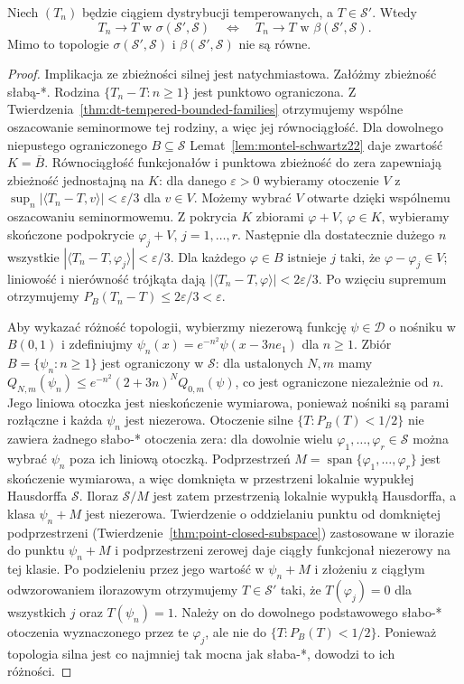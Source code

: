 \begin{twierdzenie}
\label{thm:seq-topologies-schwartz22}
Niech $(T_n)$ będzie ciągiem dystrybucji temperowanych,
a $T\in\mathcal S'$. Wtedy
\[
T_n\longrightarrow T\text{ w }\sigma(\mathcal S',\mathcal S)
\quad\Longleftrightarrow\quad
T_n\longrightarrow T\text{ w }\beta(\mathcal S',\mathcal S).
\]
Mimo to topologie $\sigma(\mathcal S',\mathcal S)$ i
$\beta(\mathcal S',\mathcal S)$ nie są równe.
\end{twierdzenie}
\begin{proof}
Implikacja ze zbieżności silnej jest natychmiastowa.
Załóżmy zbieżność słabą-*. Rodzina
$\{T_n-T:n\ge1\}$ jest punktowo ograniczona.
Z Twierdzenia~\ref{thm:dt-tempered-bounded-families}
otrzymujemy wspólne oszacowanie seminormowe tej rodziny,
a więc jej równociągłość.
Dla dowolnego niepustego ograniczonego $B\subseteq\mathcal S$
Lemat~\ref{lem:montel-schwartz22} daje zwartość
$K=\overline B$. Równociągłość funkcjonałów i
punktowa zbieżność do zera zapewniają zbieżność
jednostajną na $K$: dla danego $\varepsilon>0$
wybieramy otoczenie $V$ z
$\sup_n|\langle T_n-T,v\rangle|<\varepsilon/3$
dla $v\in V$. Możemy wybrać $V$ otwarte dzięki
wspólnemu oszacowaniu seminormowemu. Z pokrycia
$K$ zbiorami $\varphi+V$, $\varphi\in K$, wybieramy
skończone podpokrycie $\varphi_j+V$, $j=1,\ldots,r$.
Następnie dla dostatecznie dużego $n$ wszystkie
$|\langle T_n-T,\varphi_j\rangle|<\varepsilon/3$.
Dla każdego $\varphi\in B$ istnieje $j$ taki, że
$\varphi-\varphi_j\in V$; liniowość i nierówność
trójkąta dają
$|\langle T_n-T,\varphi\rangle|<2\varepsilon/3$.
Po wzięciu supremum otrzymujemy
$P_B(T_n-T)\le2\varepsilon/3<\varepsilon$.

Aby wykazać różność topologii, wybierzmy niezerową funkcję
$\psi\in\mathcal D$ o nośniku w $B(0,1)$ i zdefiniujmy
$\psi_n(x)=e^{-n^2}\psi(x-3ne_1)$ dla $n\ge1$.
Zbiór $B=\{\psi_n:n\ge1\}$ jest ograniczony w
$\mathcal S$: dla ustalonych $N,m$ mamy
$Q_{N,m}(\psi_n)\le e^{-n^2}(2+3n)^N Q_{0,m}(\psi)$,
co jest ograniczone niezależnie od $n$.
Jego liniowa otoczka jest nieskończenie wymiarowa,
ponieważ nośniki są parami rozłączne i każda $\psi_n$
jest niezerowa.
Otoczenie silne $\{T:P_B(T)<1/2\}$ nie zawiera
żadnego słabo-* otoczenia zera: dla dowolnie wielu
$\varphi_1,\ldots,\varphi_r\in\mathcal S$
można wybrać $\psi_n$ poza ich liniową otoczką.
Podprzestrzeń $M=\operatorname{span}\{\varphi_1,\ldots,
\varphi_r\}$ jest skończenie wymiarowa, a więc domknięta
w przestrzeni lokalnie wypukłej Hausdorffa $\mathcal S$.
Iloraz $\mathcal S/M$ jest zatem przestrzenią lokalnie
wypukłą Hausdorffa, a klasa $\psi_n+M$ jest niezerowa.
Twierdzenie o oddzielaniu punktu od domkniętej
podprzestrzeni (Twierdzenie~\ref{thm:point-closed-subspace})
zastosowane w ilorazie do punktu $\psi_n+M$ i podprzestrzeni
zerowej daje ciągły funkcjonał niezerowy na tej klasie.
Po podzieleniu przez jego wartość w $\psi_n+M$ i złożeniu
z ciągłym odwzorowaniem ilorazowym otrzymujemy
$T\in\mathcal S'$ taki, że $T(\varphi_j)=0$ dla
wszystkich $j$ oraz $T(\psi_n)=1$.
Należy on do dowolnego podstawowego słabo-* otoczenia
wyznaczonego przez te $\varphi_j$, ale nie do
$\{T:P_B(T)<1/2\}$. Ponieważ topologia silna jest
co najmniej tak mocna jak słaba-*, dowodzi to ich różności.
\end{proof}

